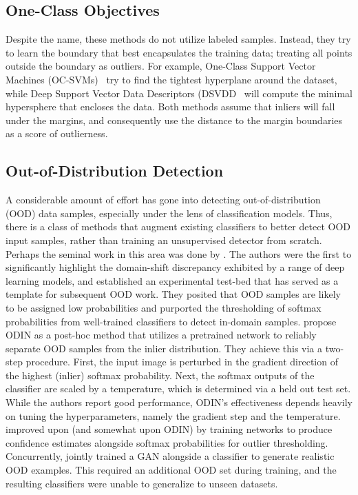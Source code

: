 \subsection{One-Class Objectives}

Despite the name, these methods do not utilize labeled samples. Instead, they try to learn the boundary that best encapsulates the training data; treating all points outside the boundary as outliers. For example, One-Class Support Vector Machines (OC-SVMs)~\cite{ocsvm} try to find the tightest hyperplane around the dataset, while Deep Support Vector Data Descriptors (DSVDD~\cite{pmlr-v80-ruff18a}  will compute the minimal hypersphere that encloses the data. Both methods assume that inliers will fall under the margins, and consequently use the distance to the margin boundaries as a score of outlierness. 

\subsection{Out-of-Distribution Detection}
A considerable amount of effort has gone into detecting out-of-distribution (OOD) data samples, especially under the lens of classification models. Thus, there is a class of methods that augment existing classifiers to better detect OOD input samples, rather than training an unsupervised detector from scratch. Perhaps the seminal work in this area was done by \citet{Hendrycks2019}. The authors were the first to significantly highlight the domain-shift discrepancy exhibited by a range of deep learning models, and established an experimental test-bed that has served as a template for subsequent OOD work. They posited that OOD samples are likely to be assigned low probabilities and purported the thresholding of softmax probabilities from well-trained classifiers to detect in-domain samples. \cite{Liang2017} propose ODIN as a post-hoc method that utilizes a pretrained network to reliably separate OOD samples from the inlier distribution. They achieve this via a two-step procedure. First, the input image is perturbed in the gradient direction of the highest (inlier) softmax probability. Next, the softmax outputs of the classifier are scaled by a temperature, which is determined via a held out test set. While the authors report good performance, ODIN's effectiveness depends heavily on tuning the hyperparameters, namely the gradient step and the temperature. \cite{devries2018learning} improved upon \cite{Hendrycks2019} (and somewhat upon ODIN) by training networks to produce confidence estimates alongside softmax probabilities for outlier thresholding. Concurrently, \cite{Lee2018} jointly trained a GAN alongside a classifier to generate realistic OOD examples. This required an additional OOD set during training, and the resulting classifiers were unable to generalize to unseen datasets.


